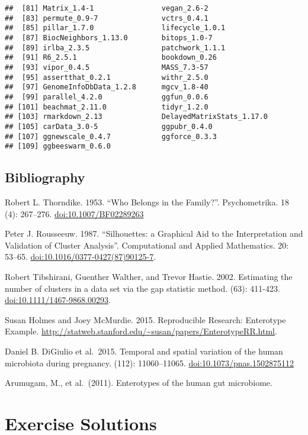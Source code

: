\documentclass[
  oneside]{book}
\begin{document}
\begin{verbatim}
##  [81] Matrix_1.4-1                vegan_2.6-2                
##  [83] permute_0.9-7               vctrs_0.4.1                
##  [85] pillar_1.7.0                lifecycle_1.0.1            
##  [87] BiocNeighbors_1.13.0        bitops_1.0-7               
##  [89] irlba_2.3.5                 patchwork_1.1.1            
##  [91] R6_2.5.1                    bookdown_0.26              
##  [93] vipor_0.4.5                 MASS_7.3-57                
##  [95] assertthat_0.2.1            withr_2.5.0                
##  [97] GenomeInfoDbData_1.2.8      mgcv_1.8-40                
##  [99] parallel_4.2.0              ggfun_0.0.6                
## [101] beachmat_2.11.0             tidyr_1.2.0                
## [103] rmarkdown_2.13              DelayedMatrixStats_1.17.0  
## [105] carData_3.0-5               ggpubr_0.4.0               
## [107] ggnewscale_0.4.7            ggforce_0.3.3              
## [109] ggbeeswarm_0.6.0
\end{verbatim}

\hypertarget{bibliography}{%
\section{Bibliography}\label{bibliography}}

Robert L. Thorndike. 1953. ``Who Belongs in the Family?''. Psychometrika. 18 (4): 267--276. \url{doi:10.1007/BF02289263}

Peter J. Rousseeuw. 1987. ``Silhouettes: a Graphical Aid to the Interpretation and Validation of Cluster Analysis''. Computational and Applied Mathematics. 20: 53--65. \url{doi:10.1016/0377-0427(87)90125-7}.

Robert Tibshirani, Guenther Walther, and Trevor Hastie. 2002. Estimating the number of clusters in a data set via the gap statistic method. (63): 411-423. \url{doi:10.1111/1467-9868.00293}.

Susan Holmes and Joey McMurdie. 2015. Reproducible Research: Enterotype Example. \url{http://statweb.stanford.edu/~susan/papers/EnterotypeRR.html}.

Daniel B. DiGiulio et al.~2015. Temporal and spatial variation of the human microbiota during pregnancy. (112): 11060--11065. \url{doi:10.1073/pnas.1502875112}

Arumugam, M., et al.~(2011). Enterotypes of the human gut microbiome.

\hypertarget{exercise-solutions}{%
\chapter{Exercise Solutions}\label{exercise-solutions}}
\end{document}
